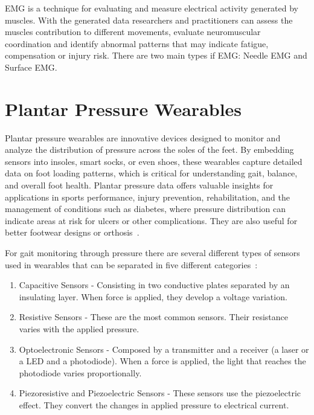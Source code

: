 \gls{EMG} is a technique for evaluating and measure electrical activity generated by muscles. With the generated data researchers and practitioners can assess the muscles contribution to different movements, evaluate neuromuscular 
coordination and identify abnormal patterns that may indicate fatigue, compensation or injury risk.
There are two main types if \gls{EMG}: Needle \gls{EMG} and Surface \gls{EMG}.



\section{Plantar Pressure Wearables}
\label{ssec:plantar_pressure_wearables_STA}

Plantar pressure wearables are innovative devices designed to monitor and analyze the distribution of pressure across the soles of the feet. By embedding sensors into insoles, smart 
socks, or even shoes, these wearables capture detailed data on foot loading patterns, which is critical for understanding gait, balance, and overall foot health. Plantar pressure data 
offers valuable insights for applications in sports performance, injury prevention, rehabilitation, and the management of conditions such as diabetes, where pressure distribution can 
indicate areas at risk for ulcers or other complications. They are also useful for better footwear designs or orthosis~\cite{coimbra, embedding, devInsole, deepLearn}.

For gait monitoring through pressure there are several different types of sensors used in wearables that can be separated in five different categories~\cite{smartSocks}:

\begin{enumerate}
  \item Capacitive Sensors - Consisting in two conductive plates separated by an insulating layer. When force is applied, they develop a voltage variation.
  \item Resistive Sensors - These are the most common sensors. Their resistance varies with the applied pressure.
  \item Optoelectronic Sensors - Composed by a transmitter and a receiver (a laser or a LED and a photodiode). When a force is applied, the light that reaches the photodiode varies proportionally.
  \item Piezoresistive and Piezoelectric Sensors - These sensors use the  piezoelectric effect. They convert the changes in applied pressure to electrical current.
\end{enumerate}

